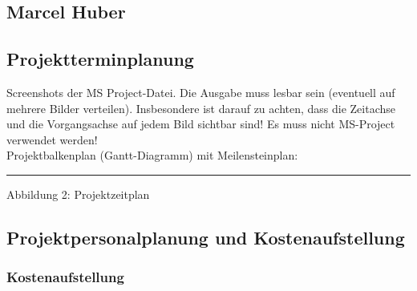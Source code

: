 \documentclass[12pt,a4paper]{article}
\newcommand{\cmnt}[1]{}			%
\newcommand{\yhbu}[0]{\color{ydkbu}}	%
\begin{document}
{ \newpage
 \subsection{Marcel Huber}


 \subsection{Projektterminplanung}
	{\yhbu
	Screenshots der MS Project-Datei.
	Die Ausgabe muss lesbar sein (eventuell auf mehrere Bilder verteilen).
	Insbesondere ist darauf zu achten,
	dass die Zeitachse und die Vorgangsachse auf jedem Bild sichtbar sind!
	Es muss nicht MS-Project verwendet werden!
	\\[2mm]
	Projektbalkenplan (Gantt-Diagramm) mit Meilensteinplan:
	}
	\\[2mm]
	\hspace*{12mm}
	\rule{37mm}{0pt} Abbildung 2: Projektzeitplan

\newpage
 \subsection{Projektpersonalplanung und Kostenaufstellung}
 \cmnt{
	{\yhbu
	Eine Abschätzung von
	{\em Personal, Material, Fremdleistungen}
	und der damit zusammenhängenden {\em Kosten}
	ist in der Vor- bzw. Startphase zu erstellen.
	\\[1mm]
	Grundsätzlich ist die Verfügbarkeit der Ressourcen zu klären.
	ACHTUNG: Es ist zu beachten,
	dass nicht immer alle notwendigen Materialien im Lager
	und Ressourcen (zBsp. Werkstaetten)
	vorhanden bzw. frei sind.
	Die Beschaffung der Materialien ist im Zeitplan mit zu berücksichtigen.
	}
	}
  \subsubsection{Kostenaufstellung}
	\begin{center}
	

\end{center}}
\end{document}
